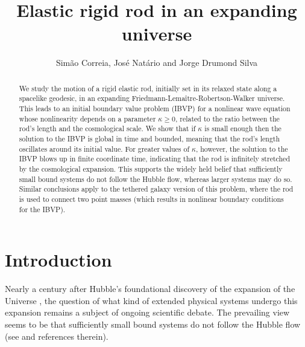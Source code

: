 \documentclass[10pt]{amsart}
\begin{document}
%
%
\begin{abstract}
We study the motion of a rigid elastic rod, initially set in its relaxed state along a spacelike geodesic, in an expanding Friedmann-Lema\^itre-Robertson-Walker universe. This leads to an initial boundary value problem (IBVP) for a nonlinear wave equation whose nonlinearity depends on a parameter $\kappa \geq 0$, related to the ratio between the rod's length and the cosmological scale. We show that if $\kappa$ is small enough then the solution to the IBVP is global in time and bounded, meaning that the rod's length oscillates around its initial value. For greater values of  $\kappa$, however, the solution to the IBVP blows up in finite coordinate time, indicating that the rod is infinitely stretched by the cosmological expansion. This supports the widely held belief that sufficiently small bound systems do not follow the Hubble flow, whereas larger systems may do so. Similar conclusions apply to the tethered galaxy version of this problem, where the rod is used to connect two point masses (which results in nonlinear boundary conditions for the IBVP).
\end{abstract}
%
%
\title{Elastic rigid rod in an expanding universe}
%
\author{Sim\~{a}o Correia, Jos\'{e} Nat\'{a}rio and Jorge Drumond Silva}
\address{Center for Mathematical Analysis, Geometry and Dynamical Systems, Mathematics Department, Instituto Superior T\'ecnico, Universidade de Lisboa, Portugal}
%
%
\maketitle
%
%
%
%
\thispagestyle{empty}
%
%
%
\section*{Introduction}
%
Nearly a century after Hubble's foundational discovery of the expansion of the Universe \cite{Hubble29}, the question of what kind of extended physical systems undergo this expansion remains a subject of ongoing scientific debate. The prevailing view seems to be that sufficiently small bound systems do not follow the Hubble flow (see \cite{McVittie33, ES45, DP64, NP71, Anderson95, Bonnor96, CFV98, Bonnor99, FJ07, CG10, NLH12, PR12} and references therein).
\end{document}
